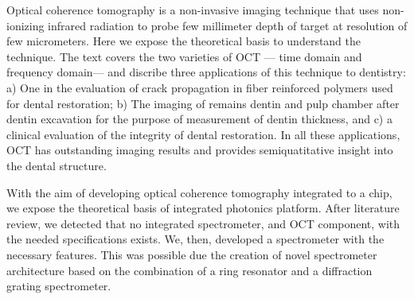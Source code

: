 Optical coherence tomography is a non-invasive imaging technique that uses non-ionizing infrared radiation to probe few millimeter depth of target at resolution of few micrometers. Here we expose the theoretical basis to understand the technique. The text covers the two varieties of OCT --- time domain and frequency domain--- and discribe three applications of this technique to dentistry: a) One in the evaluation of crack propagation in fiber reinforced polymers used for dental restoration; b) The imaging of remains dentin and pulp chamber after dentin excavation for the purpose of measurement of dentin thickness, and c) a clinical evaluation of the integrity of dental restoration. In all these applications, OCT has outstanding imaging results and provides semiquatitative insight into the dental structure.

With the aim of developing optical coherence tomography integrated to a chip, we expose the theoretical basis of integrated photonics platform. After literature review, we detected that no integrated spectrometer, and OCT component, with the needed specifications exists. We, then, developed a spectrometer with the necessary features. This was possible due the creation of novel spectrometer architecture based on the combination of a ring resonator and a diffraction grating spectrometer.
